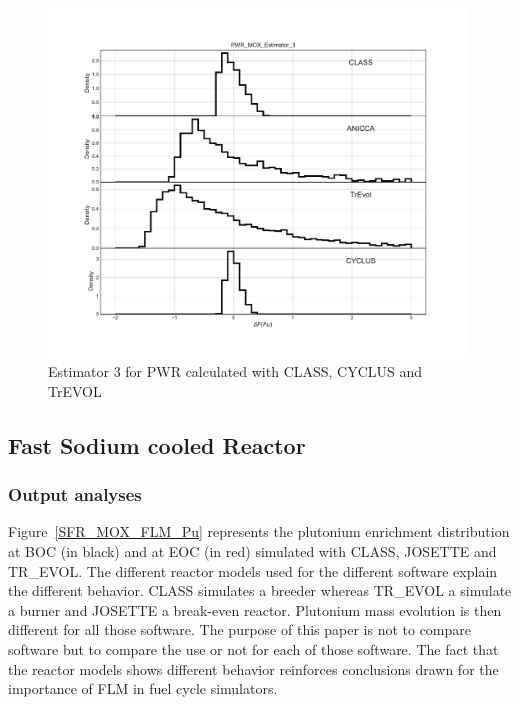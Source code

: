 \begin{figure}[h]
	\begin{center}
		\includegraphics[width = 0.99\textwidth]{../../Feature_1/RAW_DATA/FIG/PWR_MOX_Estimator_3.pdf}
		\caption{Estimator 3 for PWR calculated with CLASS, CYCLUS and TrEVOL}
		\label{fig:Est3_PWR}
	\end{center}
\end{figure}

\subsection{Fast Sodium cooled Reactor}
\subsubsection{Output analyses}

Figure~\ref{SFR_MOX_FLM_Pu} represents the plutonium enrichment distribution at
BOC (in black) and at EOC (in red) simulated with CLASS, JOSETTE and TR\_EVOL.
The different reactor models used for the different software explain the
different behavior. CLASS simulates a breeder whereas TR\_EVOL a simulate a
burner and JOSETTE a break-even reactor. Plutonium mass evolution is then
different for all those software. The purpose of this paper is not to compare
software but to compare the use or not for each of those software. The fact that
the reactor models shows different behavior reinforces conclusions drawn for the
importance of FLM in fuel cycle simulators.     

